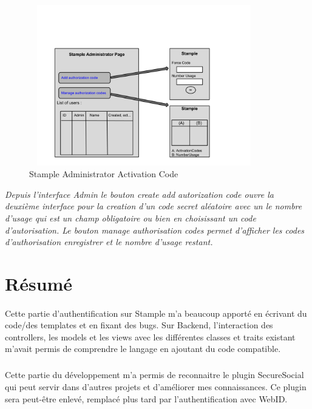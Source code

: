 \begin{figure}[H]
        \centering
                \centering
                \includegraphics[width=10cm,height=7cm]{AdminPage.png}
                \caption{Stample Administrator Activation Code}
                \label{fig:Stample Administrator Activation Code}
       
\end{figure}

\textit{Depuis l'interface Admin le bouton create add autorization code ouvre la deuxième interface pour la creation d'un code secret aléatoire avec un le nombre d'usage qui est un champ obligatoire ou bien en choisissant un code d'autorisation.
Le bouton manage authorisation codes permet d'afficher les codes d'authorisation enregistrer et le nombre d'usage restant.
}
\newpage
\section{Résumé}
\paragraph{}
Cette partie d'authentification sur Stample m'a beaucoup apporté en écrivant du code/des templates et en fixant des bugs.
Sur Backend, l'interaction des controllers, les models et les views avec les différentes classes et traits existant m'avait permis de comprendre le langage en ajoutant du code compatible.
\subparagraph{}
Cette partie du développement m'a permis de reconnaitre le plugin SecureSocial qui peut servir dans d'autres projets et d'améliorer mes connaissances. 
Ce plugin sera peut-être enlevé, remplacé plus tard par l'authentification avec WebID. 
